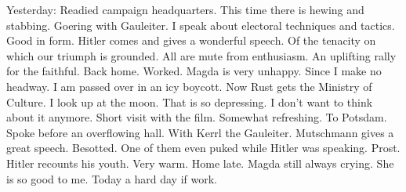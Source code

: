 Yesterday: Readied campaign headquarters. This time there is hewing and stabbing. Goering with Gauleiter. I speak about electoral techniques and tactics. Good in form. Hitler comes and gives a wonderful speech. Of the tenacity on which our triumph is grounded. All are mute from enthusiasm. An uplifting rally for the faithful. Back home. Worked. Magda is very unhappy. Since I make no headway. I am passed over in an icy boycott. Now Rust gets the Ministry of Culture. I look up at the moon. That is so depressing. I don't want to think about it anymore. Short visit with the film. Somewhat refreshing. To Potsdam. Spoke before an overflowing hall. With Kerrl the Gauleiter. Mutschmann gives a great speech. Besotted. One of them even puked while Hitler was speaking. Prost. Hitler recounts his youth. Very warm. Home late. Magda still always crying. She is so good to me. Today a hard day if work.
